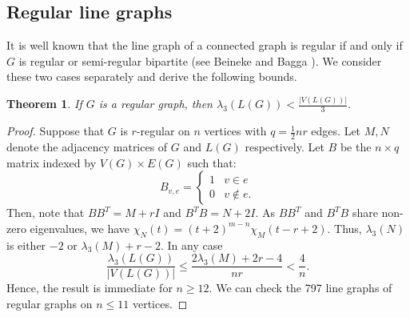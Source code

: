 \documentclass[12pt]{article}
\newtheorem{thm}{Theorem}[section]
\begin{document}
\subsection{Regular line graphs}
It is well known that the line graph of a connected graph is regular if and only if $G$ is regular or semi-regular bipartite (see Beineke and Bagga \cite{LineGraphs}). We consider these two cases separately and derive the following bounds. 
\begin{thm} If $G$ is a regular graph, then $\lambda_3(L(G)) < \frac{|V(L(G))|}{3}$.
\end{thm}
\begin{proof} Suppose that $G$ is $r$-regular on $n$ vertices with $q = \frac{1}{2}nr$ edges. Let $M,N$ denote the adjacency matrices of $G$ and $L(G)$ respectively. Let $B$ be the $n\times q$ matrix indexed by $V(G) \times E(G)$ such that:
\begin{equation*}
    B_{v,e} = \begin{cases}1 & v\in e\\ 0 & v\not\in e.\end{cases}
\end{equation*}
Then, note that $BB^T = M + rI$ and $B^TB = N + 2I$. As $BB^T$ and $B^TB$ share non-zero eigenvalues, we have $\chi_{N}(t) = (t+2)^{m-n}\chi_{M}(t-r+2)$. Thus, $\lambda_3(N)$ is either $-2$ or $\lambda_3(M)+r-2$. In any case
\begin{equation*}
    \frac{\lambda_3(L(G))}{|V(L(G))|}\le \frac{2\lambda_3(M)+2r-4}{nr} < \frac{4}{n}.
\end{equation*}
Hence, the result is immediate for $n\ge 12$. We can check the 797 line graphs of regular graphs on $n\le 11$ vertices. 
\end{proof}
\end{document}
